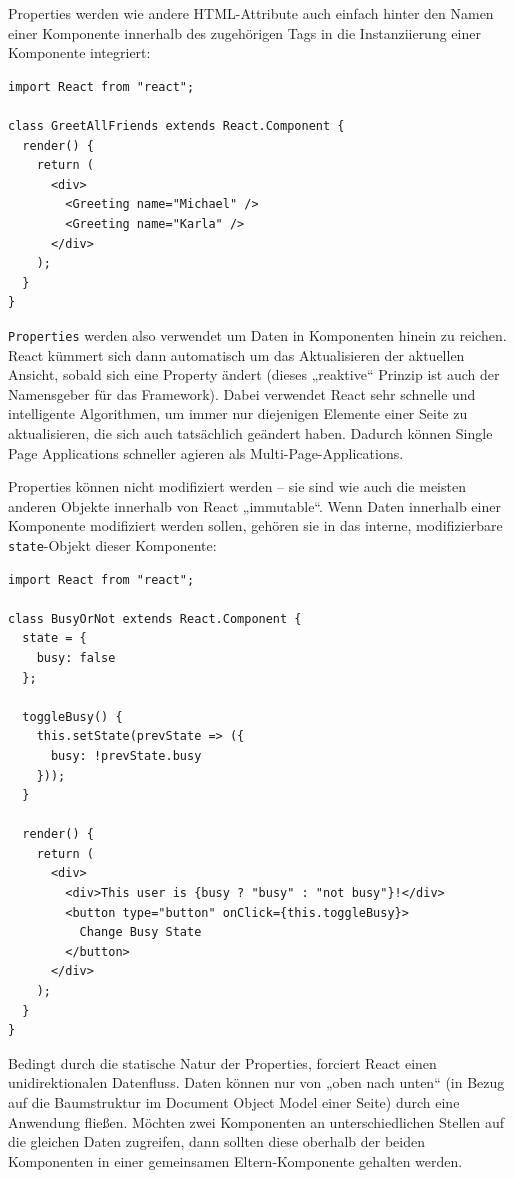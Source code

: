 Properties werden wie andere HTML-Attribute auch einfach hinter den Namen einer Komponente innerhalb des zugehörigen Tags in die Instanziierung einer Komponente integriert:

\begin{minipage}{\linewidth}
\begin{lstlisting}[caption={Properties werden wie normale HTML-Attribute verwendet.}]
import React from "react";

class GreetAllFriends extends React.Component {
  render() {
    return (
      <div>
        <Greeting name="Michael" />
        <Greeting name="Karla" />
      </div>
    );
  }
}
\end{lstlisting}
\end{minipage}

\texttt{Properties} werden also verwendet um Daten in Komponenten hinein zu reichen. React kümmert sich dann automatisch um das Aktualisieren der aktuellen Ansicht, sobald sich eine Property ändert (dieses „reaktive“ Prinzip ist auch der Namensgeber für das Framework). Dabei verwendet React sehr schnelle und intelligente Algorithmen, um immer nur diejenigen Elemente einer Seite zu aktualisieren, die sich auch tatsächlich geändert haben. Dadurch können Single Page Applications schneller agieren als Multi-Page-Applications.

Properties können nicht modifiziert werden – sie sind wie auch die meisten anderen Objekte innerhalb von React „immutable“. Wenn Daten innerhalb einer Komponente modifiziert werden sollen, gehören sie in das interne, modifizierbare \texttt{state}-Objekt dieser Komponente:

\begin{minipage}{\linewidth}
\begin{lstlisting}[caption={Jede Komponente kann über einen modifizierbaren state verfügen.}]
import React from "react";

class BusyOrNot extends React.Component {
  state = {
    busy: false
  };

  toggleBusy() {
    this.setState(prevState => ({
      busy: !prevState.busy
    }));
  }

  render() {
    return (
      <div>
        <div>This user is {busy ? "busy" : "not busy"}!</div>
        <button type="button" onClick={this.toggleBusy}>
          Change Busy State
        </button>
      </div>
    );
  }
}
\end{lstlisting}
\end{minipage}

Bedingt durch die statische Natur der Properties, forciert React einen unidirektionalen Datenfluss. Daten können nur von „oben nach unten“ (in Bezug auf die Baumstruktur im Document Object Model einer Seite) durch eine Anwendung fließen. Möchten zwei Komponenten an unterschiedlichen Stellen auf die gleichen Daten zugreifen, dann sollten diese oberhalb der beiden Komponenten in einer gemeinsamen Eltern-Komponente gehalten werden.\newline

